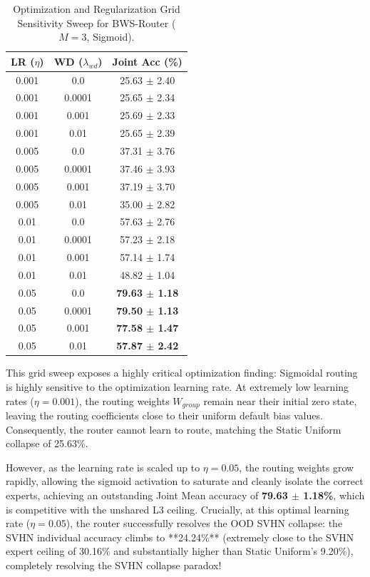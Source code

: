 \begin{table}[h]
\caption{Optimization and Regularization Grid Sensitivity Sweep for BWS-Router ($M=3$, Sigmoid).}
\label{tab:grid_sweep}
\vskip 0.15in
\begin{center}
\begin{small}
\setlength{\tabcolsep}{8pt}
\begin{tabular}{ccc}
\toprule
\textbf{LR ($\eta$)} & \textbf{WD ($\lambda_{wd}$)} & \textbf{Joint Acc (\%)} \\
\midrule
0.001 & 0.0 & 25.63 $\pm$ 2.40 \\
0.001 & 0.0001 & 25.65 $\pm$ 2.34 \\
0.001 & 0.001 & 25.69 $\pm$ 2.33 \\
0.001 & 0.01 & 25.65 $\pm$ 2.39 \\
\midrule
0.005 & 0.0 & 37.31 $\pm$ 3.76 \\
0.005 & 0.0001 & 37.46 $\pm$ 3.93 \\
0.005 & 0.001 & 37.19 $\pm$ 3.70 \\
0.005 & 0.01 & 35.00 $\pm$ 2.82 \\
\midrule
0.01 & 0.0 & 57.63 $\pm$ 2.76 \\
0.01 & 0.0001 & 57.23 $\pm$ 2.18 \\
0.01 & 0.001 & 57.14 $\pm$ 1.74 \\
0.01 & 0.01 & 48.82 $\pm$ 1.04 \\
\midrule
0.05 & 0.0 & \textbf{79.63 $\pm$ 1.18} \\
0.05 & 0.0001 & \textbf{79.50 $\pm$ 1.13} \\
0.05 & 0.001 & \textbf{77.58 $\pm$ 1.47} \\
0.05 & 0.01 & \textbf{57.87 $\pm$ 2.42} \\
\bottomrule
\end{tabular}
\end{small}
\end{center}
\vskip -0.1in
\end{table}

This grid sweep exposes a highly critical optimization finding: Sigmoidal routing is highly sensitive to the optimization learning rate. At extremely low learning rates ($\eta = 0.001$), the routing weights $W_{group}$ remain near their initial zero state, leaving the routing coefficients close to their uniform default bias values. Consequently, the router cannot learn to route, matching the Static Uniform collapse of 25.63\%. 

However, as the learning rate is scaled up to $\eta = 0.05$, the routing weights grow rapidly, allowing the sigmoid activation to saturate and cleanly isolate the correct experts, achieving an outstanding Joint Mean accuracy of \textbf{79.63 $\pm$ 1.18\%}, which is competitive with the unshared L3 ceiling. Crucially, at this optimal learning rate ($\eta = 0.05$), the router successfully resolves the OOD SVHN collapse: the SVHN individual accuracy climbs to **24.24\%** (extremely close to the SVHN expert ceiling of 30.16\% and substantially higher than Static Uniform's 9.20\%), completely resolving the SVHN collapse paradox!

